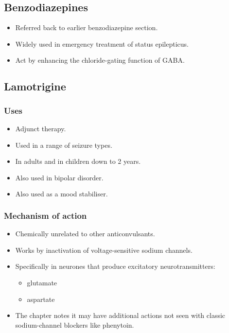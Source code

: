 \documentclass[11pt,a4paper]{article}
\begin{document}
\subsection{Benzodiazepines}
\begin{itemize}
  \item Referred back to earlier benzodiazepine section.
  \item Widely used in emergency treatment of status epilepticus.
  \item Act by enhancing the chloride-gating function of GABA.
\end{itemize}

\subsection{Lamotrigine}

\subsubsection{Uses}
\begin{itemize}
  \item Adjunct therapy.
  \item Used in a range of seizure types.
  \item In adults and in children down to 2 years.
  \item Also used in bipolar disorder.
  \item Also used as a mood stabiliser.
\end{itemize}

\subsubsection{Mechanism of action}
\begin{itemize}
  \item Chemically unrelated to other anticonvulsants.
  \item Works by inactivation of voltage-sensitive sodium channels.
  \item Specifically in neurones that produce excitatory neurotransmitters:
  \begin{itemize}
    \item glutamate
    \item aspartate
  \end{itemize}
  \item The chapter notes it may have additional actions not seen with classic sodium-channel blockers like phenytoin.
\end{itemize}
\end{document}

